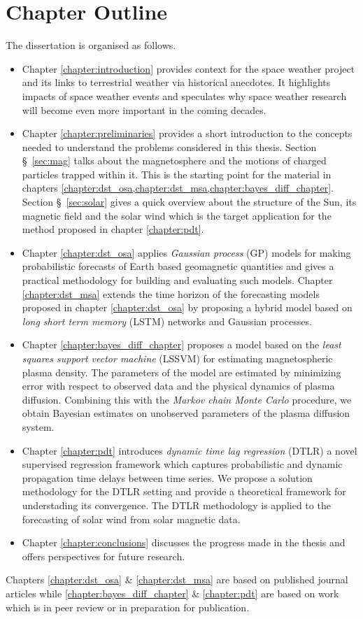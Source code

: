 \section{Chapter Outline}

The dissertation is organised as follows.

\begin{itemize}
    \item Chapter \ref{chapter:introduction} provides context for the space weather project and its 
    links to terrestrial weather via historical anecdotes. It highlights impacts of space weather events 
    and speculates why space weather research will become even more important in the coming decades.

    \item Chapter \ref{chapter:preliminaries} provides a short introduction to the concepts needed to 
    understand the problems considered in this thesis. Section \S~\ref{sec:mag} talks about the magnetosphere and 
    the motions of charged particles trapped within it. This is the starting point for the material in chapters 
    \cref{chapter:dst_osa,chapter:dst_msa,chapter:bayes_diff_chapter}. Section \S~\ref{sec:solar} gives a 
    quick overview about the structure of the Sun, its magnetic field and the solar wind which is the target 
    application for the method proposed in chapter \ref{chapter:pdt}.
    
    \item Chapter \ref{chapter:dst_osa} applies \emph{Gaussian process} (GP) models for making probabilistic forecasts of 
    Earth based geomagnetic quantities and gives a practical methodology for building and evaluating such models. 
    Chapter \ref{chapter:dst_msa} extends the time horizon of the forecasting models proposed in chapter \ref{chapter:dst_osa} 
    by proposing a hybrid model based on \emph{long short term memory} (LSTM) networks and Gaussian processes.
    
    \item Chapter \ref{chapter:bayes_diff_chapter} proposes a model based on the \emph{least squares support vector machine} (LSSVM) 
    for estimating magnetospheric plasma density. The parameters of the model are estimated by minimizing error with respect to 
    observed data and the physical dynamics of plasma diffusion. Combining this with the \emph{Markov chain Monte Carlo} procedure, we 
    obtain Bayesian estimates on unobserved parameters of the plasma diffusion system.   
    
    \item Chapter \ref{chapter:pdt} introduces \emph{dynamic time lag regression} (DTLR) a novel supervised regression framework 
    which captures probabilistic and dynamic propagation time delays between time series. We propose a solution methodology for 
    the DTLR setting and provide a theoretical framework for understading its convergence. The DTLR methodology is applied to the 
    forecasting of solar wind from solar magnetic data. 
    
    \item Chapter \ref{chapter:conclusions} discusses the progress made in the thesis and offers perspectives for future research.
\end{itemize}


Chapters \ref{chapter:dst_osa} \& \ref{chapter:dst_msa} are based on published journal articles while \ref{chapter:bayes_diff_chapter} \& 
\ref{chapter:pdt} are based on work which is in peer review or in preparation for publication.  